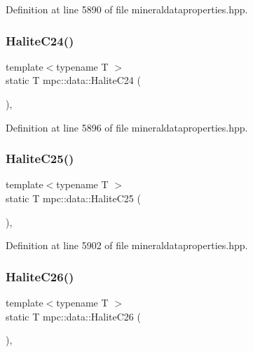Definition at line 5890 of file mineraldataproperties.\+hpp.

\mbox{\label{namespacempc_1_1data_aed16bb130fe01f384872ba7ab037d79a}} 
\subsubsection{\texorpdfstring{Halite\+C24()}{HaliteC24()}}
{\footnotesize\ttfamily template$<$typename T $>$ \\
static T mpc\+::data\+::\+Halite\+C24 (\begin{DoxyParamCaption}{ }\end{DoxyParamCaption})\hspace{0.3cm}{\ttfamily [inline]}, {\ttfamily [static]}}



Definition at line 5896 of file mineraldataproperties.\+hpp.

\mbox{\label{namespacempc_1_1data_a1b54f6df69db2631d0a14e4f0b9b00fb}} 
\subsubsection{\texorpdfstring{Halite\+C25()}{HaliteC25()}}
{\footnotesize\ttfamily template$<$typename T $>$ \\
static T mpc\+::data\+::\+Halite\+C25 (\begin{DoxyParamCaption}{ }\end{DoxyParamCaption})\hspace{0.3cm}{\ttfamily [inline]}, {\ttfamily [static]}}



Definition at line 5902 of file mineraldataproperties.\+hpp.

\mbox{\label{namespacempc_1_1data_a9ac276866ee96a28b9d546623a3d33a3}} 
\subsubsection{\texorpdfstring{Halite\+C26()}{HaliteC26()}}
{\footnotesize\ttfamily template$<$typename T $>$ \\
static T mpc\+::data\+::\+Halite\+C26 (\begin{DoxyParamCaption}{ }\end{DoxyParamCaption})\hspace{0.3cm}{\ttfamily [inline]}, {\ttfamily [static]}}




